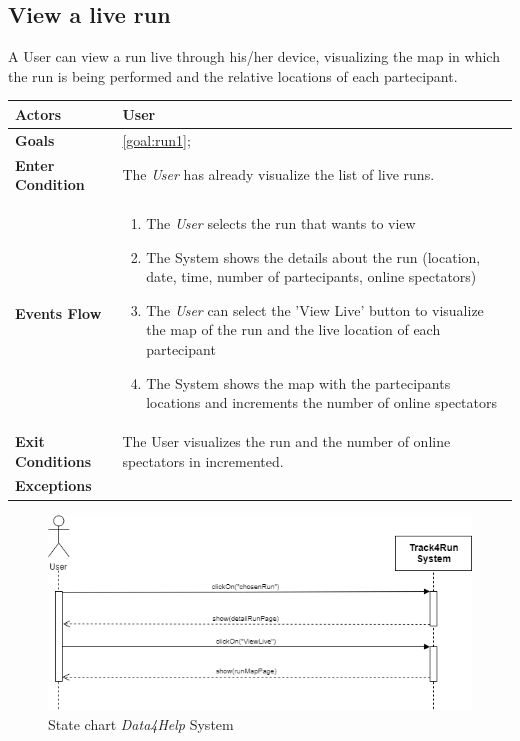   \subsection{View a live run}
A User can view a run live through his/her device, visualizing the map in which the run is being performed and the relative locations of each partecipant.

\begin{table}[H]
	\centering
    
    \begin{tabular}{|p{3.5cm}|p{10.3cm}|}
    
    \hline
    \textbf{\large{Actors}}  			& \tabitem User 	\\
    				 					
    \hline
    \textbf{\large{Goals}} 				& \ref{goal:run1};\\
    
    \hline
    \textbf{\large{Enter Condition}}	& The \emph{User} has already visualize the list of live runs.		\\
    
    \hline
    \textbf{\large{Events Flow}}		& \begin{enumerate}[leftmargin=0.5cm]
                                          	\item The \emph{User}  selects the run that wants to view
                                            \item The System shows the details about the run (location, date, time, number of partecipants, online spectators)
                                             \item The \emph{User} can select the 'View Live' button to visualize the map of the run and the live location of each partecipant
                                            \item The System shows the map with the partecipants locations and increments the number of online spectators
                                           
                                          \end{enumerate}
    										\\
    \hline
    \textbf{\large{Exit Conditions}}    & The User visualizes the run and the number of online spectators in incremented.  \\
    
    \hline
    \textbf{\large{Exceptions}} 		& \\
    
    \hline
    
    
    \end{tabular}
	
\end{table}

\begin{figure}[H]
    \centering
    \includegraphics[scale=0.4]{Pictures/viewLiveRun.png}
    \caption{State chart  \emph{Data4Help} System}
\end{figure}
